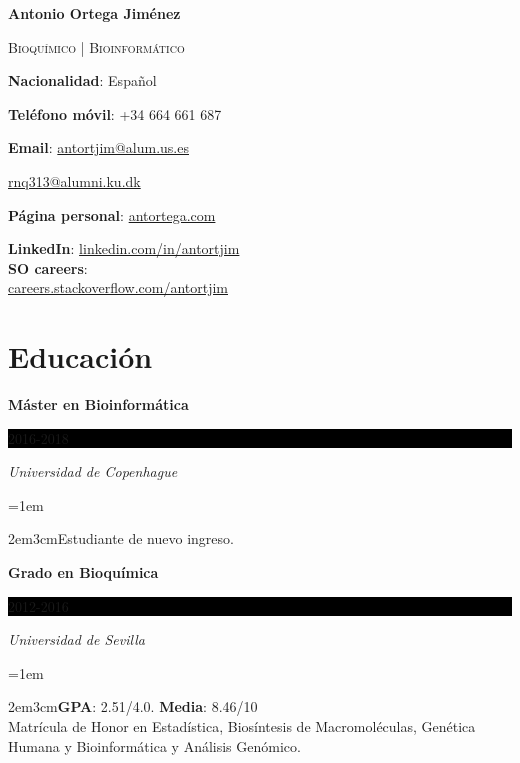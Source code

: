 \documentclass[paper=a4,fontsize=11pt]{article} %
\newcommand{\sepspace}{\vspace*{1em}}		%
\newcommand{\MyName}[1]{ %
		\Huge \usefont{OT1}{phv}{b}{n} \hfill #1
		\par \normalsize \normalfont}
\newcommand{\MySlogan}[1]{ %
		\large \usefont{OT1}{phv}{m}{n}\hfill \textit{#1}
		\par \normalsize \normalfont}
\newcommand{\NewPart}[1]{\section*{
									{#1}}}
\newcommand{\EducationEntry}[4]{
		\noindent \textbf{#1} \hfill      %
		\colorbox{Black}{%
			\parbox{6em}{%
			\hfill\color{White}#2}} \par  %
		\noindent \textit{#3} \par        %
		\noindent\hangindent=1em\hangafter=0 \small \begin{changemargin}{2em}{3cm}#4 \end{changemargin} %
		\normalsize \par}
\begin{document}

%


\def\name{\textcolor{StrongRed}{Antonio Ortega Jim\'enez}}

\centerline{\LARGE\bf \name}
\vspace{0.1in}
\centerline{\textcolor{awesome-red}{\textsc{Bioquímico | Bioinformático}}}
\vspace{0.25in}



\begin{minipage}[t]{0.6\textwidth}
  \textbf{Nacionalidad}: Español \par
  \textbf{Teléfono móvil}: +34 664 661 687 \par
  \textbf{Email}: \href{mailto:antortjim@alum.us.es}{antortjim@alum.us.es} \par
  \leftskip=1.1cm  \href{mailto:rnq313@alumni.ku.dk}{rnq313@alumni.ku.dk} \par
  \leftskip=0cm \textbf{Página personal}: \href{http://www.antortega.com}{antortega.com} \par
  
\end{minipage}
\begin{minipage}[t]{0.3\textwidth}
  \textbf{LinkedIn}: \href{http://www.linkedin.com/in/antortjim}{linkedin.com/in/antortjim} \\
   \textbf{SO careers}:\\
   \href{http://careers.stackoverflow.com/antortjim}{careers.stackoverflow.com/antortjim} \\
\end{minipage}

\NewPart{Educación}{}

\EducationEntry{Máster en Bioinformática}{2016-2018}{Universidad de Copenhague}{Estudiante de nuevo ingreso.}
\sepspace

\EducationEntry{Grado en Bioquímica}{2012-2016}{Universidad de Sevilla}{\textbf{GPA}: 2.51/4.0. \textbf{Media}: 8.46/10 \\
  Matrícula de Honor en Estadística, Biosíntesis de Macromoléculas, Genética Humana y Bioinformática y Análisis Genómico.}
\sepspace
  
\end{document}
